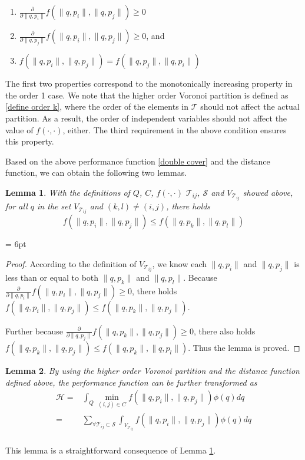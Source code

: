 \documentclass[letterpaper, 10 pt, conference]{ieeeconf}
\newtheorem{lemma}{Lemma}
\begin{document}
\begin{enumerate}
  \item $\frac{\partial}{\partial \|q,p_i\|}f(\|q,p_i\|,\|q,p_j\|)\geq 0$ \\
  \item $\frac{\partial}{\partial \|q,p_j\|}f(\|q,p_i\|,\|q,p_j\|)\geq 0$, and \\
  \item $f(\|q,p_i\|,\|q,p_j\|)=f(\|q,p_j\|,\|q,p_i\|)$
\end{enumerate}
The first two properties correspond to the monotonically increasing property in the order 1 case. We note that the higher order Voronoi partition is defined as
\eqref{define order k}, where the order of the elements in $\mathcal{T}$ should not affect the actual partition. As a result,  the order of independent variables should not affect the value of $f(\cdot, \cdot)$, either. The third requirement in the above condition ensures this property.


Based on the above performance function \eqref{double cover} and the distance function, we can obtain the following two lemmas.

\begin{lemma}
\label{lemma1} With the definitions of $Q$, $C$, $f(\cdot, \cdot)$ $\mathcal{T}_{ij}$, $\mathcal{S}$ and $V_{\mathcal{T}_{ij}}$ showed above,
for all $q$ in the set $V_{\mathcal{T}_{ij}}$ and  $(k,l)\neq(i,j)$, there holds \begin{equation} f(\|q,p_i\|,\|q,p_j\|) \leq f(\|q,p_k\|,\|q,p_l\|)\end{equation}
\end{lemma}

\parskip= 6pt
\begin{proof}
According to the definition of $V_{\mathcal{T}_{ij}}$, we know each $\|q,p_i\|$ and $\|q,p_j\|$ is less than or equal to both $\|q,p_k\|$ and $\|q,p_l\|$. Because $\frac{\partial}{\partial \|q,p_i\|}f(\|q,p_i\|,\|q,p_j\|)\geq 0$, there holds $f(\|q,p_i\|,\|q,p_j\|)\leq f(\|q,p_k\|,\|q,p_j\|)$.

Further because $\frac{\partial}{\partial \|q,p_j\|}f(\|q,p_k\|,\|q,p_j\|)\geq 0$, there also holds $f(\|q,p_k\|,\|q,p_j\|)\leq f(\|q,p_k\|,\|q,p_l\|)$. Thus the lemma is proved.
\end{proof}

\begin{lemma} By using the higher order Voronoi partition and the distance function defined above, the performance function can be further transformed as
\begin{equation}
\label{double min achieve}
\begin{split}
\mathcal{H}=&\int_Q \min_{(i,j)\in C}f(\|q,p_i\|,\|q,p_j\|) \phi(q) dq\\
=&\sum_{\forall\mathcal{T}_{ij}\subset\mathcal{S}}\int_{V_{\mathcal{T}_{ij}}}f(\|q,p_i\|,\|q,p_j\|) \phi(q) dq\\
\end{split}
\end{equation}
\end{lemma}
This lemma is a straightforward consequence of Lemma \ref{lemma1}.
\end{document}

